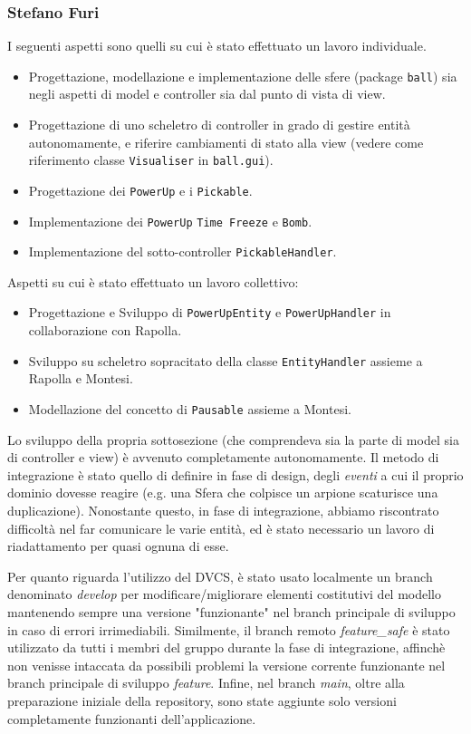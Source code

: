 \documentclass[a4paper,12pt]{report}
\begin{document}
\subsubsection{Stefano Furi}
I seguenti aspetti sono quelli su cui è stato effettuato un lavoro individuale.
\begin{itemize}
    \item Progettazione, modellazione e implementazione delle sfere (package \texttt{ball}) sia negli aspetti di model e controller sia dal punto di vista di view.
    \item Progettazione di uno scheletro di controller in grado di gestire entità autonomamente, e riferire cambiamenti di stato alla view (vedere come riferimento classe \texttt{Visualiser} in \texttt{ball.gui}). 
    \item Progettazione dei \texttt{PowerUp} e i \texttt{Pickable}. 
    \item Implementazione dei \texttt{PowerUp} \texttt{Time Freeze} e \texttt{Bomb}.
    \item Implementazione del sotto-controller \texttt{PickableHandler}.
\end{itemize}
Aspetti su cui è stato effettuato un lavoro collettivo:
\begin{itemize}
    \item Progettazione e Sviluppo di \texttt{PowerUpEntity} e \texttt{PowerUpHandler} in collaborazione con Rapolla.
    \item Sviluppo su scheletro sopracitato della classe \texttt{EntityHandler} assieme a Rapolla e Montesi.
    \item Modellazione del concetto di \texttt{Pausable} assieme a Montesi.
\end{itemize}
Lo sviluppo della propria sottosezione (che comprendeva sia la parte di model sia di controller e view) è avvenuto completamente autonomamente. Il metodo di integrazione è stato quello di definire in fase di design, degli \emph{eventi} a cui il proprio dominio dovesse reagire (e.g. una Sfera che colpisce un arpione scaturisce una duplicazione). Nonostante questo, in fase di integrazione, abbiamo riscontrato difficoltà nel far comunicare le varie entità, ed è stato necessario un lavoro di riadattamento per quasi ognuna di esse. 

Per quanto riguarda l'utilizzo del DVCS, è stato usato localmente un branch denominato \emph{develop} per modificare/migliorare elementi costitutivi del modello mantenendo sempre una versione "funzionante" nel branch principale di sviluppo in caso di errori irrimediabili. Similmente, il branch remoto \emph{feature\_safe} è stato utilizzato da tutti i membri del gruppo durante la fase di integrazione, affinchè non venisse intaccata da possibili problemi la versione corrente funzionante nel branch principale di sviluppo \emph{feature}. Infine, nel branch \emph{main}, oltre alla preparazione iniziale della repository, sono state aggiunte solo versioni completamente funzionanti dell'applicazione.
\end{document}
